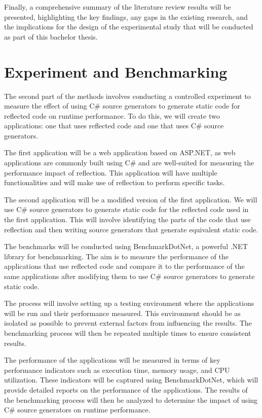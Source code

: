Finally, a comprehensive summary of the literature review results will be presented, highlighting the key findings, any gaps in the existing research, and the implications for the design of the experimental study that will be conducted as part of this bachelor thesis.


\section{Experiment and Benchmarking}

The second part of the methods involves conducting a controlled experiment to measure the effect of using C\# source generators to generate static code for reflected code on runtime performance. To do this, we will create two applications: one that uses reflected code and one that uses C\# source generators.

The first application will be a web application based on ASP.NET, as web applications are commonly built using C\# and are well-suited for measuring the performance impact of reflection. This application will have multiple functionalities and will make use of reflection to perform specific tasks.

The second application will be a modified version of the first application. We will use C\# source generators to generate static code for the reflected code used in the first application. This will involve identifying the parts of the code that use reflection and then writing source generators that generate equivalent static code.

The benchmarks will be conducted using BenchmarkDotNet, a powerful .NET library for benchmarking. The aim is to measure the performance of the applications that use reflected code and compare it to the performance of the same applications after modifying them to use C\# source generators to generate static code.

The process will involve setting up a testing environment where the applications will be run and their performance measured. This environment should be as isolated as possible to prevent external factors from influencing the results. The benchmarking process will then be repeated multiple times to ensure consistent results.

The performance of the applications will be measured in terms of key performance indicators such as execution time, memory usage, and CPU utilization. These indicators will be captured using BenchmarkDotNet, which will provide detailed reports on the performance of the applications. The results of the benchmarking process will then be analyzed to determine the impact of using C\# source generators on runtime performance.

